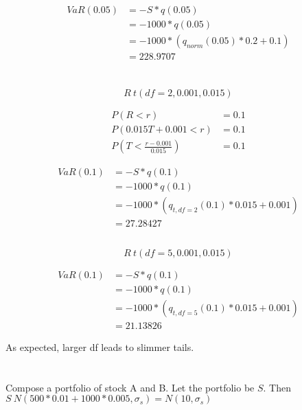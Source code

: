 \documentclass[11pt]{scrartcl}
\begin{document}
\begin{align*}
VaR(0.05) &= -S * q(0.05) \\
&= -1000 * q(0.05) \\
&= -1000 * (q_{norm}(0.05) * 0.2 + 0.1) \\
&= 228.9707
\end{align*}

\section{}

\subsection{}

\[R~t(df=2, 0.001, 0.015)\]

\begin{align*}
P(R < r) &= 0.1 \\
P(0.015T + 0.001 < r) &= 0.1 \\
P(T < \frac{r-0.001}{0.015}) &= 0.1
\end{align*}

\begin{align*}
VaR(0.1) &= -S * q(0.1) \\
&= -1000 * q(0.1) \\
&= -1000 * (q_{t, df=2}(0.1) * 0.015 + 0.001) \\
&= 27.28427
\end{align*}

\subsection{}

\[R~t(df=5, 0.001, 0.015)\]

\begin{align*}
VaR(0.1) &= -S * q(0.1) \\
&= -1000 * q(0.1) \\
&= -1000 * (q_{t, df=5}(0.1) * 0.015 + 0.001) \\
&= 21.13826
\end{align*}

As expected, larger df leads to slimmer tails.

\section{}

Compose a portfolio of stock A and B. Let the portfolio be $S$. Then $S ~ N(500*0.01 + 1000*0.005, \sigma_s) = N(10, \sigma_s)$
\end{document}
